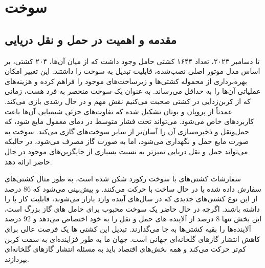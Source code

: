 \chapter{سوخت }
\section{ مقدمه و اهمیت  در حمل و نقل دریایی}
تا دسامبر ۲۰۲۳، تعداد ۱۶۴۴ کشتی حامل
 وجود داشت که از میان آن‌ها، ۲۰۴ کشتی، بر اساس مدل موتور اصلی نصب‌شده، قابلیت تبدیل به سوخت 
 را داشتند. این تغییر امکان بهره‌برداری از محموله کشتی‌ها و زیرساخت‌های موجود را فراهم کرده و هزینه‌های عملیاتی آن‌ها را به حداقل می‌رساند. 
به عنوان یک سوخت 
منحصر به فرد هست،‌ زمانی که از کربن‌‌زدایی در کشتی صحبت می‌کنیم نقش مهم و در حال رشدی 
بازی می‌کند.
عمدتاً از پروپان و بوتان تشکیل شده که تفاوت‌های جزئی شیمیایی آن‌ها باعث کاربردهای خاص می‌شود.
می‌تواند تحت فشار متوسط در دمای معمول مایع شود، که حمل‌ونقل و ذخیره‌سازی آن را آسان‌تر از سایر سوخت‌های گازی می‌کند.
سوخت 
به صورت مایع حمل و نگهداری می‌شود، اما به صورت گاز مصرف می‌شود، در حالیکه می‌تواند حمل و نقل دریایی تمیزتر به نسبت  بسیاری از جایگزین‌های موجود در حال حاضر ارائه دهد.

سفارشات کشتی‌های با سوخت 
 رکورد شکن شده است، به طور مثال کشتی‌های
  سفارش داده شده یا در حال ساخت با
   حرکت می‌کنند. و پیش‌بینی می‌شود که 86 درصد از این نوع کشتی‌های  
     جدیدی که در سال‌های آینده وارد بازار می‌شوند، قابلیت کار با 
    را داشته باشند. اگرچه 
    در حال حاضر یک سوخت محبوب برای حامل های گاز بزرگ است، این بخش تنها 8 درصد از آلاینده های حمل و نقل را به خود اختصاص می‌دهد و 92 درصد آلاینده‌ها را بقیه کشتی‌ها به جا می‌گذارند. تبدیل این کشتی ها یک فرصت عالی برای کاهش انتشار گازهای گلخانه‌ای جهانی است.
جهان ما به طور فزاینده‌ای به سمت کربن کم‌تر حرکت می‌کند و همه بخش‌های اقتصاد باید به مسئله انتشار گازهای گلخانه‌ای بپردازند.
\newpage

